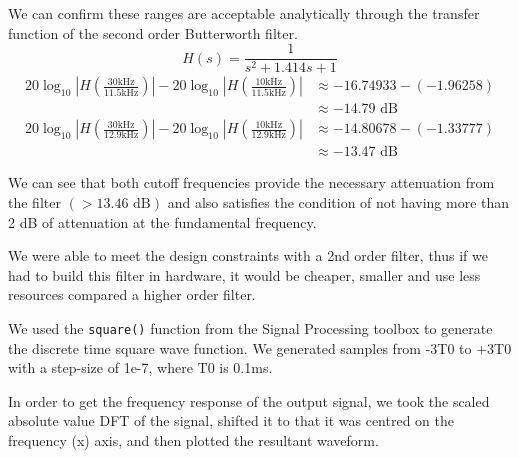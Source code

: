 \documentclass[12pt]{article}
\begin{document}
We can confirm these ranges are acceptable analytically through the transfer function of the second order Butterworth filter.
\begin{equation*}
    H(s) = \frac{1}{s^2 + 1.414s + 1}
\end{equation*}
\begin{equation}
\begin{aligned}
    20\log_{10}{\left|H\left(\frac{30 \text{kHz}}{11.5 \text{kHz}}\right)\right|} - 20\log_{10}{\left|H\left(\frac{10 \text{kHz}}{11.5 \text{kHz}}\right)\right|} &\approx -16.74933 - (-1.96258) \\
    &\approx -14.79 \text{ dB}
\end{aligned}
\end{equation}
\begin{equation}
\begin{aligned}
    20\log_{10}{\left|H\left(\frac{30 \text{kHz}}{12.9 \text{kHz}}\right)\right|} - 20\log_{10}{\left|H\left(\frac{10 \text{kHz}}{12.9 \text{kHz}}\right)\right|} &\approx -14.80678 - (-1.33777) \\
    &\approx -13.47 \text{ dB}
\end{aligned}
\end{equation}

We can see that both cutoff frequencies provide the necessary attenuation from the filter $(> 13.46 \text{ dB})$ and also satisfies the condition of not having more than 2 dB of attenuation at the fundamental frequency.

We were able to meet the design constraints with a 2nd order filter, thus if we had to build this filter in hardware, it would be cheaper, smaller and use less resources compared a higher order filter.

We used the \verb|square()| function from the Signal Processing toolbox to generate the discrete time square wave function. We generated samples from -3T0 to +3T0 with a step-size of 1e-7, where T0 is 0.1ms.


In order to get the frequency response of the output signal, we took the scaled absolute value DFT of the signal, shifted it to that it was centred on the frequency (x) axis, and then plotted the resultant waveform.
\end{document}
